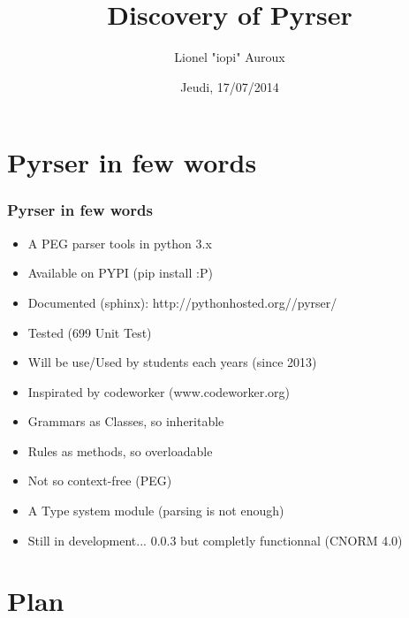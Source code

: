 \documentclass[pdftex]{beamer}
\title{Discovery of Pyrser}
\author{Lionel "iopi" Auroux}
\date{Jeudi, 17/07/2014}
\begin{document}
\scriptsize
\begin{frame}
  \titlepage
\end{frame}

\section{Pyrser in few words}
\frame
{
    \frametitle{Pyrser in few words}
    \begin{itemize}
        \item   A PEG parser tools in python 3.x
        \item   Available on PYPI (pip install :P)
        \item   Documented (sphinx): http://pythonhosted.org//pyrser/
        \item   Tested (699 Unit Test)
        \item   Will be use/Used by students each years (since 2013)
        \item   Inspirated by codeworker (www.codeworker.org)
        \item   Grammars as Classes, so inheritable
        \item   Rules as methods, so overloadable
        \item   Not so context-free (PEG)
        \item   A Type system module (parsing is not enough)
        \item   Still in development... 0.0.3 but completly functionnal (CNORM 4.0)
    \end{itemize}

}

\section{Plan}
\end{document}
